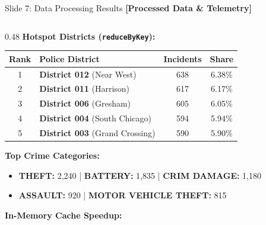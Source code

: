 \documentclass[aspectratio=169]{beamer}
\begin{document}
\begin{frame}{Slide 7: Data Processing Results \hfill \footnotesize\color{AmritaMaroon}\textbf{[Processed Data \& Telemetry]}}
    \begin{columns}[T]
        \begin{column}{0.48\textwidth}
            \textbf{\textcolor{NavyBlue}{Hotspot Districts (\texttt{reduceByKey}):}}
            \vspace{0.02cm}
            {\fontsize{5.5}{6.8}\selectfont
            \begin{table}
                \centering
                \renewcommand{\arraystretch}{1.08}
                \begin{tabular}{clcc}
                    \toprule
                    \textbf{Rank} & \textbf{Police District} & \textbf{Incidents} & \textbf{Share} \\
                    \midrule
                    1 & \textbf{District 012} (Near West) & 638 & 6.38\% \\
                    2 & \textbf{District 011} (Harrison)  & 617 & 6.17\% \\
                    3 & \textbf{District 006} (Gresham)   & 605 & 6.05\% \\
                    4 & \textbf{District 004} (South Chicago) & 594 & 5.94\% \\
                    5 & \textbf{District 003} (Grand Crossing) & 590 & 5.90\% \\
                    \bottomrule
                \end{tabular}
            \end{table}
            }
            \vspace{0.02cm}
            \textbf{\textcolor{NavyBlue}{Top Crime Categories:}}
            \begin{itemize}\tiny
                \setlength{\itemsep}{1pt}
                \item \textbf{THEFT:} 2,240 | \textbf{BATTERY:} 1,835 | \textbf{CRIM DAMAGE:} 1,180
                \item \textbf{ASSAULT:} 920 | \textbf{MOTOR VEHICLE THEFT:} 815
            \end{itemize}
            \textbf{\textcolor{NavyBlue}{In-Memory Cache Speedup:}}
            \begin{itemize}\tiny

\end{itemize}
\end{column}
\end{columns}
\end{frame}
\end{document}
